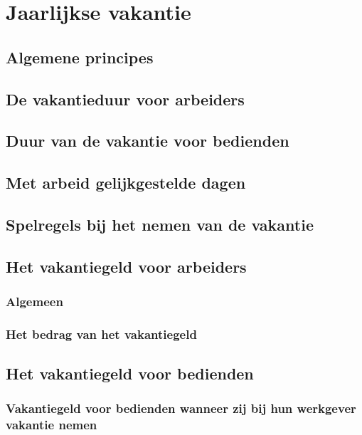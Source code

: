 \chapter{Jaarlijkse vakantie}
\label{hoofdstuk:2}

\section{Algemene principes}

\section{De vakantieduur voor arbeiders}

\section{Duur van de vakantie voor bedienden}

\section{Met arbeid gelijkgestelde dagen}

\section{Spelregels bij het nemen van de vakantie}

\section{Het vakantiegeld voor arbeiders}

\subsection{Algemeen}

\subsection{Het bedrag van het vakantiegeld}

\section{Het vakantiegeld voor bedienden}

\subsection{Vakantiegeld voor bedienden wanneer zij bij hun werkgever vakantie nemen}

